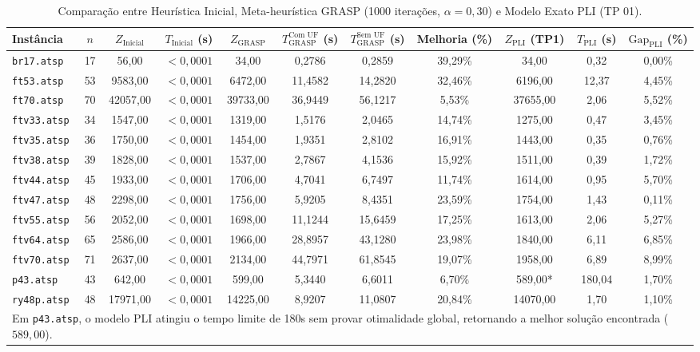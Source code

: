 \documentclass[10pt,a4paper]{article}
\begin{document}
\begin{table}[H]
\centering
\scriptsize
\setlength{\tabcolsep}{3.0pt}
\caption{Comparação entre Heurística Inicial, Meta-heurística GRASP (1000 iterações, $\alpha=0,30$) e Modelo Exato PLI (TP 01).}
\label{tab:comparacao}
\begin{tabular}{lcccccccccc}
\toprule
Instância & $n$ & $Z_{\text{Inicial}}$ & $T_{\text{Inicial}}$ (s) & $Z_{\text{GRASP}}$ & $T_{\text{GRASP}}^{\text{Com UF}}$ (s) & $T_{\text{GRASP}}^{\text{Sem UF}}$ (s) & Melhoria (\%) & $Z_{\text{PLI}}$ (TP1) & $T_{\text{PLI}}$ (s) & $\text{Gap}_{\text{PLI}}$ (\%) \\
\midrule
\texttt{br17.atsp}  & 17 & 56,00    & $< 0,0001$ & 34,00    & 0,2786  & 0,2859  & 39,29\% & 34,00    & 0,32   & 0,00\% \\
\texttt{ft53.atsp}  & 53 & 9583,00  & $< 0,0001$ & 6472,00  & 11,4582 & 14,2820 & 32,46\% & 6196,00  & 12,37  & 4,45\% \\
\texttt{ft70.atsp}  & 70 & 42057,00 & $< 0,0001$ & 39733,00 & 36,9449 & 56,1217 & 5,53\%  & 37655,00 & 2,06   & 5,52\% \\
\texttt{ftv33.atsp} & 34 & 1547,00  & $< 0,0001$ & 1319,00  & 1,5176  & 2,0465  & 14,74\% & 1275,00  & 0,47   & 3,45\% \\
\texttt{ftv35.atsp} & 36 & 1750,00  & $< 0,0001$ & 1454,00  & 1,9351  & 2,8102  & 16,91\% & 1443,00  & 0,35   & 0,76\% \\
\texttt{ftv38.atsp} & 39 & 1828,00  & $< 0,0001$ & 1537,00  & 2,7867  & 4,1536  & 15,92\% & 1511,00  & 0,39   & 1,72\% \\
\texttt{ftv44.atsp} & 45 & 1933,00  & $< 0,0001$ & 1706,00  & 4,7041  & 6,7497  & 11,74\% & 1614,00  & 0,95   & 5,70\% \\
\texttt{ftv47.atsp} & 48 & 2298,00  & $< 0,0001$ & 1756,00  & 5,9205  & 8,4351  & 23,59\% & 1754,00  & 1,43   & 0,11\% \\
\texttt{ftv55.atsp} & 56 & 2052,00  & $< 0,0001$ & 1698,00  & 11,1244 & 15,6459 & 17,25\% & 1613,00  & 2,06   & 5,27\% \\
\texttt{ftv64.atsp} & 65 & 2586,00  & $< 0,0001$ & 1966,00  & 28,8957 & 43,1280 & 23,98\% & 1840,00  & 6,11   & 6,85\% \\
\texttt{ftv70.atsp} & 71 & 2637,00  & $< 0,0001$ & 2134,00  & 44,7971 & 61,8545 & 19,07\% & 1958,00  & 6,89   & 8,99\% \\
\texttt{p43.atsp}   & 43 & 642,00   & $< 0,0001$ & 599,00   & 5,3440  & 6,6011  & 6,70\%  & 589,00*  & 180,04 & 1,70\% \\
\texttt{ry48p.atsp} & 48 & 17971,00 & $< 0,0001$ & 14225,00 & 8,9207  & 11,0807 & 20,84\% & 14070,00 & 1,70   & 1,10\% \\
\bottomrule
\multicolumn{11}{l}{\tiny *Em \texttt{p43.atsp}, o modelo PLI atingiu o tempo limite de 180s sem provar otimalidade global, retornando a melhor solução encontrada ($589,00$).}
\end{tabular}
\end{table}
\end{document}
